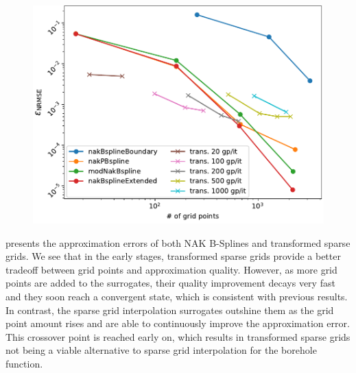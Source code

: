 \documentclass[
  a4paper,  %
  twoside,  %
  bibliography=totoc,
  headsepline,
  cleardoublepage=empty,
  parskip=half,
  draft=false
]{scrbook}
\begin{document}
\begin{mdframed}[style=style]
\begin{figure}[H]
\includegraphics[width=\textwidth]{graphics/borehole}
\delimit
{}
\label{fig:borehole_comp}
\end{figure}
\end{mdframed}

 presents the approximation errors of both NAK B-Splines and transformed sparse grids.
We see that in the early stages, transformed sparse grids provide a better tradeoff between grid points and approximation quality.
However, as more grid points are added to the surrogates, their quality improvement decays very fast and they soon reach a convergent state, which is consistent with previous results.
In contrast, the sparse grid interpolation surrogates outshine them as the grid point amount rises and are able to continuously improve the approximation error.
This crossover point is reached early on, which results in transformed sparse grids not being a viable alternative to sparse grid interpolation for the borehole function.
\end{document}
